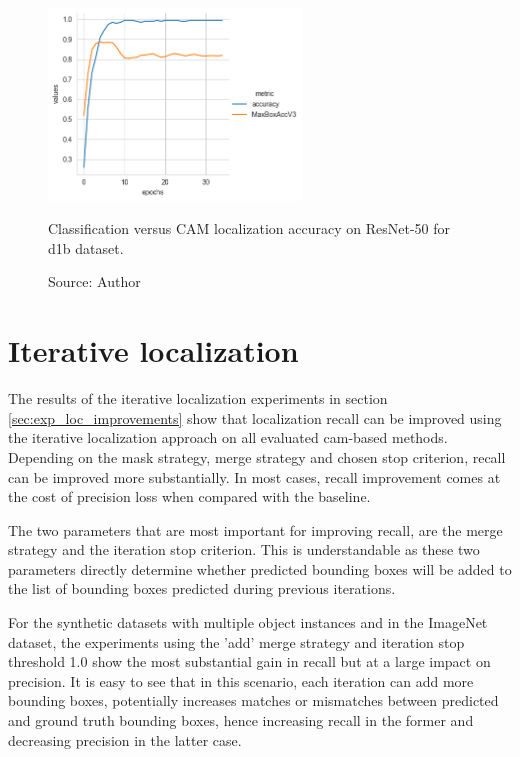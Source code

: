 \begin{figure}[ht]
\begin{center}
    \includegraphics[width=0.6\textwidth]{images/fig_loc_vs_acc_resnet50_cam_d1b.png}
    \caption[Classification versus CAM localization accuracy on ResNet-50 for d1b dataset]{Classification versus CAM localization accuracy on ResNet-50 for d1b dataset.}
    \caption*{Source: Author}
    \label{fig:loc_vs_acc_resnet50_cam_d1b}
\end{center}
\end{figure}

\section{Iterative localization} \label{dis:iterative_localization}
The results of the iterative localization experiments in section \ref{sec:exp_loc_improvements} show that localization recall can be improved using the iterative localization approach on all evaluated \acrshort{cam}-based methods. Depending on the mask strategy, merge strategy and chosen stop criterion, recall can be improved more substantially. In most cases, recall improvement comes at the cost of precision loss when compared with the baseline.

The two parameters that are most important for improving recall, are the merge strategy and the iteration stop criterion. This is understandable as these two parameters directly determine whether predicted bounding boxes will be added to the list of bounding boxes predicted during previous iterations. 

For the synthetic datasets with multiple object instances and in the ImageNet dataset, the experiments using the 'add' merge strategy and iteration stop threshold 1.0 show the most substantial gain in recall but at a large impact on precision. It is easy to see that in this scenario, each iteration can add more bounding boxes, potentially increases matches or mismatches between predicted and ground truth bounding boxes, hence increasing recall in the former and decreasing precision in the latter case.

